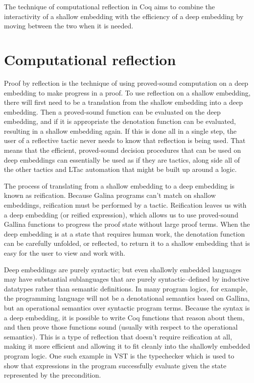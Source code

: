 \documentclass{puthesis}
\begin{document}
The technique of computational reflection in Coq aims to combine the
interactivity of a shallow embedding with the efficiency of a deep
embedding by moving between the two when it is needed.

\section{Computational reflection}
\label{sec:reflection}

Proof by reflection is the technique of using proved-sound computation
on a deep embedding to make progress in a proof. To use reflection on
a shallow embedding, there will first need to be a translation from
the shallow embedding into a deep embedding. Then a proved-sound
function can be evaluated on the deep embedding, and if it is
appropriate the denotation function can be evaluated, resulting in a
shallow embedding again.  If this is done all in a single step, the
user of a reflective tactic never needs to know that reflection is
being used. That means that the efficient, proved-sound decision
procedures that can be used on deep embeddings can essentially be used
as if they are tactics, along side all of the other tactics and LTac
automation that might be built up around a logic.

The process of translating from a shallow embedding to a deep
embedding is known as reification. Because Galina programs can't match on
shallow embeddings, reification must be performed by a
tactic. Reification leaves us with a deep embedding (or reified
expression), which allows us to use proved-sound Gallina functions to
progress the proof state without large proof terms. When the deep
embedding is at a state that requires human work, the denotation
function can be carefully unfolded, or reflected, to return it to a
shallow embedding that is easy for the user to view and work with.


Deep embeddings are purely syntactic; but even shallowly embedded
languages may have substantial sublanguages that are purely
syntactic--defined by inductive datatypes rather than semantic
definitions. In many program logics, for example, the programming
language will not be a denotational semantics based on Gallina, but an
operational semantics over syntactic program terms. Because the syntax
is a deep embedding, it is possible to write Coq functions that reason
about them, and then prove those functions sound (usually with respect
to the operational semantics). This is a type of reflection that
doesn't require reification at all, making it more efficient and
allowing it to fit cleanly into the shallowly embedded program
logic. One such example in VST is the typechecker which is used to
show that expressions in the program successfully evaluate given the
state represented by the precondition.
\end{document}
